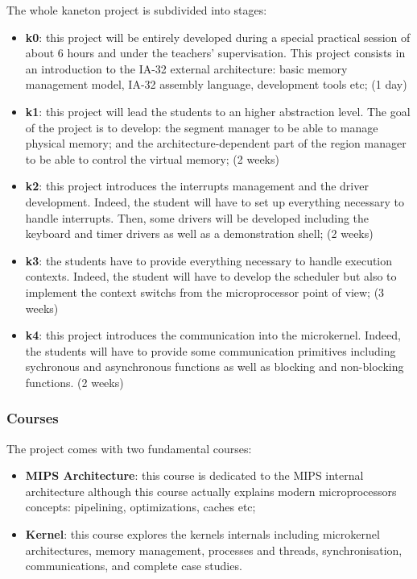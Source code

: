 \begin{multicols}{2}
The whole kaneton project is subdivided into stages:

\begin{itemize}
  \item
    \textbf{k0}: this project will be entirely developed during a
    special practical session of about 6 hours and under the teachers'
    supervisation. This project consists in an introduction to the
    IA-32 external architecture: basic memory management model,
    IA-32 assembly language, development tools etc; (1 day)
  \item
    \textbf{k1}: this project will lead the students to an higher abstraction
    level. The goal of the project is to develop: the segment manager to be
    able to manage physical memory; and the architecture-dependent part of the
    region manager to be able to control the virtual memory; (2 weeks)
  \item
    \textbf{k2}: this project introduces the interrupts management and
    the driver development. Indeed, the student will have to set up
    everything necessary to handle interrupts. Then, some drivers will
    be developed including the keyboard and timer drivers as well as a
    demonstration shell; (2 weeks)
  \item
    \textbf{k3}: the students have to provide everything necessary
    to handle execution contexts. Indeed, the student will have to
    develop the scheduler but also to implement the context switchs from
    the microprocessor point of view; (3 weeks)
  \item
    \textbf{k4}: this project introduces the communication into the
    microkernel. Indeed, the students will have to provide some
    communication primitives including sychronous and asynchronous
    functions as well as blocking and non-blocking functions. (2 weeks)
\end{itemize}


\subsubsection{Courses}

The project comes with two fundamental courses:

\begin{itemize}
  \item
    \textbf{MIPS Architecture}: this course is dedicated to the MIPS internal
    architecture although this course actually explains modern microprocessors
    concepts: pipelining, optimizations, caches etc;
  \item
    \textbf{Kernel}: this course explores the kernels internals including
    microkernel architectures, memory management, processes and threads,
    synchronisation, communications, and complete case studies.
\end{itemize}


\end{multicols}
